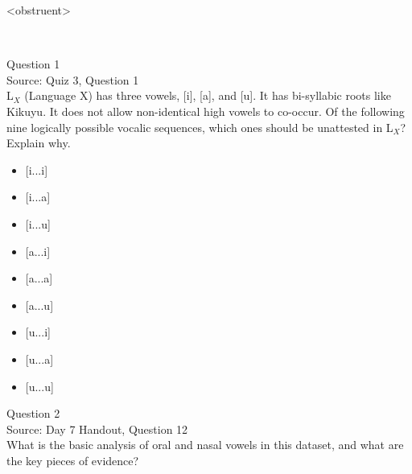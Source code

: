 \documentclass[12pt]{article}
\begin{document}
<obstruent>


\newpage

\begin{center}
\textbf{{\color{red}{\HUGE END OF EXAM}}}\\

\end{center}
\newpage

\begin{center}
\textbf{{\color{blue}{\HUGE START OF EXAM\\}}}

\textbf{{\color{blue}{\HUGE Student ID: 9246\\}}}

\textbf{{\color{blue}{\HUGE 2:00 - 2:15 PM\\}}}

\end{center}
\newpage

{\large Question 1}\\

Source: Quiz 3, Question 1\\

L$_X$ (Language X) has three vowels, [i], [a], and [u]. It has bi-syllabic roots like Kikuyu. It does not allow non-identical high vowels to co-occur. Of the following nine logically possible vocalic sequences, which ones should be unattested in L$_X$? Explain why.\\

\begin{itemize} \item {[i...i]} \item {[i...a]} \item {[i...u]} \item {[a...i]} \item {[a...a]} \item {[a...u]} \item {[u...i]} \item {[u...a]} \item {[u...u]} \end{itemize}


\newpage

{\large Question 2}\\

Source: Day 7 Handout, Question 12\\

What is the basic analysis of oral and nasal vowels in this dataset, and what are the key pieces of evidence?\\
\end{document}
